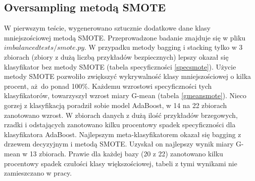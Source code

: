 \subsection{Oversampling metodą SMOTE}
W pierwszym teście, wygenerowano sztucznie dodatkowe dane klasy mniejszościowej metodą SMOTE. Przeprowadzone badanie znajduje się w pliku $imbalancedtests/smote.py$. W przypadku metody bagging i stacking tylko w 3 zbiorach (zbiory z dużą liczbą przykładów bezpiecznych) lepszy okazał się klasyfikator bez metody SMOTE (tabela specyficzności \ref{specsmote}). Użycie metody SMOTE pozwoliło zwiększyć wykrywalność klasy mniejszościowej o kilka procent, aż do ponad 100\%. Każdemu wzrostowi specyficzności tych klasyfikatorów, towarzyszył wzrost miary G-mean (tabela \ref{gmeansmote}). Nieco gorzej z klasyfikacją poradził sobie model AdaBoost, w 14 na 22 zbiorach zanotowano wzrost. W zbiorach danych z dużą ilość przykładów brzegowych, rzadki i odstających zanotowano kilku procentowy spadek specyficzności dla klasyfikatora AdaBoost. Najlepszym meta-klasyfikatorem okazał się bagging z drzewem decyzyjnym i metodą SMOTE. Uzyskał on najlepszy wynik miary G-mean w 13 zbiorach. Prawie dla każdej bazy (20 z 22) zanotowano kilku procentowy spadek czułości klasy większościowej, tabeli z tymi wynikami nie zamieszczano w pracy.
